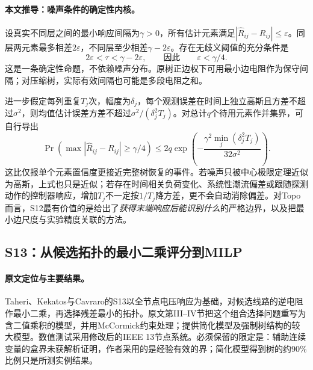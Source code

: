 \paragraph{本文推导：噪声条件的确定性内核。}
设真实不同层之间的最小响应间隔为$\gamma>0$，所有估计元素满足$|\widehat R_{ij}-R_{ij}|\leq\varepsilon$。同层两元素最多相差$2\varepsilon$，不同层至少相差$\gamma-2\varepsilon$。存在无歧义阈值的充分条件是
\begin{equation}
 2\varepsilon<\tau<\gamma-2\varepsilon,
 \qquad\text{因此}\qquad \varepsilon<\gamma/4.
 \label{eq:probe-layer-margin}
\end{equation}
这是一条确定性命题，不依赖噪声分布。原树正边权下可用最小边电阻作为保守间隔；对压缩树，实际有效间隔也可能是多段电阻之和。

进一步假定每列重复$T_j$次，幅度为$\delta_j$，每个观测误差在时间上独立高斯且方差不超过$\sigma^2$，则均值估计误差方差不超过$\sigma^2/(\delta_j^2T_j)$。对总计$q$个待用元素作并集界，可自行导出
\begin{equation}
 \Pr\!\left(\max|\widehat R_{ij}-R_{ij}|\geq\gamma/4\right)
 \leq 2q\exp\!\left(-\frac{\gamma^2\min_j(\delta_j^2T_j)}{32\sigma^2}\right).
 \label{eq:probe-confidence}
\end{equation}
这比仅报单个元素置信度更接近完整树恢复的事件。若噪声只被中心极限定理近似为高斯，上式也只是近似；若存在时间相关负荷变化、系统性潮流偏差或跟随探测动作的控制器响应，增加$T_j$不一定按$1/T_j$降方差，更不会自动消除偏差。对Topo而言，S12最有价值的是给出了\emph{获得末端响应后能识别什么}的严格边界，以及把最小边尺度与实验精度关联的方法。

\subsection{S13：从候选拓扑的最小二乘评分到MILP}
\label{subsec:S13}

\paragraph{原文定位与主要结果。}
Taheri、Kekatos与Cavraro的S13\citep{S13}以全节点电压响应为基础，对候选线路的逆电阻作最小二乘，再选择残差最小的拓扑。原文第III--IV节把这个组合选择问题重写为含二值乘积的模型，并用McCormick约束处理；提供简化模型及强制树结构的较大模型。数值测试采用修改后的IEEE 13节点系统。必须保留的限定是：辅助连续变量的盒界未获解析证明，作者采用的是经验有效的界；简化模型得到树的约90\%比例只是所测实例结果。

